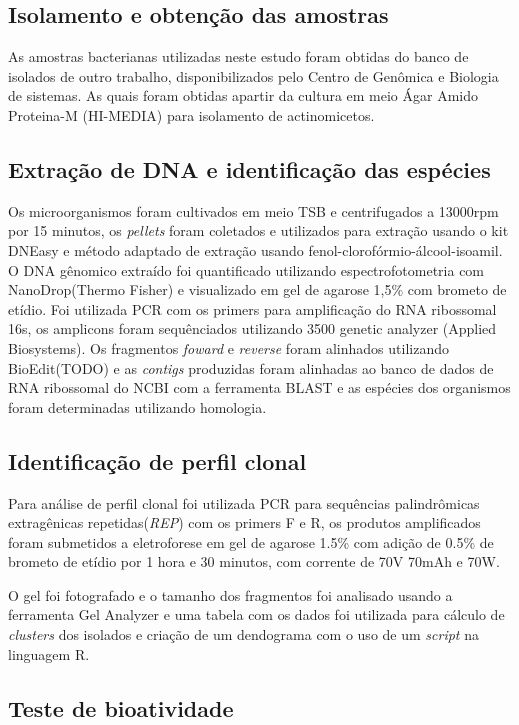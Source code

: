 \subsection{Isolamento e obtenção das amostras}
As amostras bacterianas utilizadas neste estudo foram obtidas do banco de isolados de outro
trabalho, disponibilizados pelo Centro de Genômica e Biologia de sistemas. As quais foram
obtidas apartir da cultura em meio Ágar Amido Proteina-M (HI-MEDIA) para isolamento de actinomicetos.

\subsection{Extração de DNA e identificação das espécies}
Os microorganismos foram cultivados em meio TSB e centrifugados a 13000rpm por 15 minutos,
os \textit{pellets} foram coletados e utilizados para extração usando o kit DNEasy e método
adaptado de extração usando  fenol-clorofórmio-álcool-isoamil. O DNA gênomico extraído
foi quantificado utilizando espectrofotometria com NanoDrop(Thermo Fisher) e visualizado
em gel de agarose 1,5\% com brometo de etídio. 
Foi utilizada PCR com os primers %
para amplificação do RNA ribossomal 16s, os amplicons foram sequênciados utilizando 3500 
genetic analyzer (Applied Biosystems). Os fragmentos \textit{foward} e \textit{reverse}
foram alinhados utilizando BioEdit(TODO) e as \textit{contigs} produzidas foram
alinhadas ao banco de dados de RNA ribossomal do NCBI com a ferramenta BLAST e as espécies
dos organismos foram determinadas utilizando homologia.  

\subsection{Identificação de perfil clonal}
Para análise de perfil clonal foi utilizada PCR para sequências palindrômicas
extragênicas repetidas(\textit{REP}) com os primers F e R, os produtos amplificados
foram submetidos a eletroforese em gel de agarose 1.5\% com adição de 0.5\% de
brometo de etídio por 1 hora e 30 minutos, com corrente de 70V 70mAh e 70W.

O gel foi fotografado e o tamanho dos fragmentos foi analisado usando a ferramenta
Gel Analyzer e uma tabela com os dados foi utilizada para cálculo de \textit{clusters}
dos isolados e criação de um dendograma com o uso de um \textit{script} na
linguagem R.

\subsection{Teste de bioatividade}
